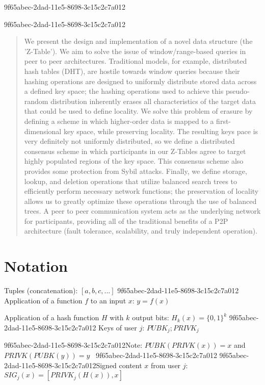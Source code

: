 \documentclass[12pt]{article}
\begin{document}
9f65abec-2dad-11e5-8698-3c15c2c7a012
\maketitle
9f65abec-2dad-11e5-8698-3c15c2c7a012
\begin{abstract}
We present the design and implementation of a novel data structure (the 'Z-Table'). We aim to solve the issue of window/range-based queries in peer to peer architectures. Traditional models, for example,  distributed hash tables (DHT), are hostile towards window queries because their hashing operations are designed to uniformly distribute stored data across a defined key space; the hashing operations used to achieve this pseudo-random distribution inherently erases all characteristics of the target data that could be used to define locality. We solve this problem of erasure by defining a scheme in which higher-order data is mapped to a first-dimensional key space, while preserving locality. The resulting keys pace is very definitely not uniformly distributed, so we define a distributed consensus scheme in which participants in our Z-Tables agree to target highly populated regions of the key space. This consensus scheme also provides some protection from Sybil attacks. Finally, we define storage, lookup, and deletion operations that utilize balanced search trees to efficiently perform necessary network functions; the preservation of locality allows us to greatly optimize these operations through the use of balanced trees. A peer to peer communication system acts as the underlying network for participants, providing all of the traditional benefits of a P2P architecture (fault tolerance, scalability, and truly independent operation).
\end{abstract}

\section{Notation}

Tuples (concatenation): $[a,b,c,...]$
9f65abec-2dad-11e5-8698-3c15c2c7a012
Application of a function $f$ to an input $x$: $y=f(x)$

Application of a hash function $H$ with $k$ output bits: $H_{k}(x) = \{0,1\}^k$
9f65abec-2dad-11e5-8698-3c15c2c7a012
Keys of user $j$: $ PUBK_j; PRIVK_j $

9f65abec-2dad-11e5-8698-3c15c2c7a012Note: $PUBK(PRIVK(x)) = x$ and $PRIVK(PUBK(y)) = y$~
9f65abec-2dad-11e5-8698-3c15c2c7a012
9f65abec-2dad-11e5-8698-3c15c2c7a012Signed content $x$ from user $j$: $SIG_j(x) = \left[ PRIVK_j( H(x) ), x \right]$
\end{document}
